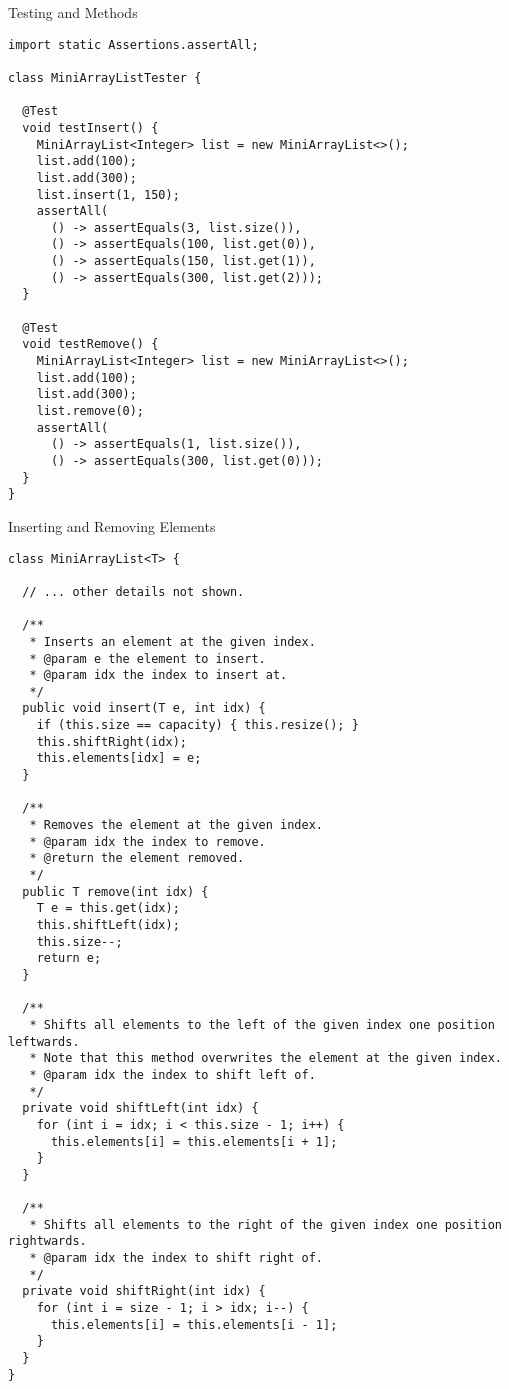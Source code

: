 \begin{cl}[]{Testing   and  Methods}
\begin{lstlisting}[language=MyJava]
import static Assertions.assertAll;

class MiniArrayListTester {

  @Test
  void testInsert() {
    MiniArrayList<Integer> list = new MiniArrayList<>();
    list.add(100);
    list.add(300);
    list.insert(1, 150);
    assertAll(
      () -> assertEquals(3, list.size()),
      () -> assertEquals(100, list.get(0)),
      () -> assertEquals(150, list.get(1)),
      () -> assertEquals(300, list.get(2)));
  }

  @Test
  void testRemove() {
    MiniArrayList<Integer> list = new MiniArrayList<>();
    list.add(100);
    list.add(300);
    list.remove(0);
    assertAll(
      () -> assertEquals(1, list.size()),
      () -> assertEquals(300, list.get(0)));
  }
}
\end{lstlisting}
\end{cl}

\begin{cl}[]{ Inserting and Removing Elements}
\begin{lstlisting}[language=MyJava]
class MiniArrayList<T> {

  // ... other details not shown.

  /**
   * Inserts an element at the given index.
   * @param e the element to insert.
   * @param idx the index to insert at.
   */
  public void insert(T e, int idx) {
    if (this.size == capacity) { this.resize(); }
    this.shiftRight(idx);
    this.elements[idx] = e;
  }

  /**
   * Removes the element at the given index.
   * @param idx the index to remove.
   * @return the element removed.
   */
  public T remove(int idx) {
    T e = this.get(idx);
    this.shiftLeft(idx);
    this.size--;
    return e;
  }

  /**
   * Shifts all elements to the left of the given index one position leftwards.
   * Note that this method overwrites the element at the given index.
   * @param idx the index to shift left of.
   */
  private void shiftLeft(int idx) {
    for (int i = idx; i < this.size - 1; i++) {
      this.elements[i] = this.elements[i + 1];
    }
  }

  /**
   * Shifts all elements to the right of the given index one position rightwards.
   * @param idx the index to shift right of.
   */
  private void shiftRight(int idx) {
    for (int i = size - 1; i > idx; i--) {
      this.elements[i] = this.elements[i - 1];
    }
  }
}
\end{lstlisting}
\end{cl}

